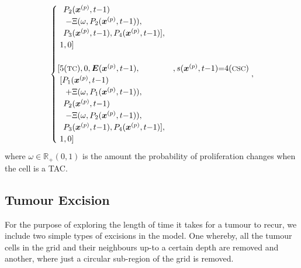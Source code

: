 \documentclass[\main/thesis.tex]{subfiles}
\begin{document}
\begin{align}
\begin{cases}
                     \hspace{0.25cm} P_2(\boldsymbol{x}^{(p)}, t{-}1) \\
                     \hspace{0.35cm} {-} \Xi(\omega, P_2(\boldsymbol{x}^{(p)}, t{-}1)),\\
                     \hspace{0.25cm} P_3(\boldsymbol{x}^{(p)}, t{-}1),
                                     P_4(\boldsymbol{x}^{(p)}, t{-}1) ],\\
                     \hspace{0.1cm}  1, 0 ] \\
                     \\
                     [ 5 (\text{{\footnotesize TC}}), 0, 
                       \boldsymbol{E}(\boldsymbol{x}^{(p)}, t{-}1),
                       &, s(\boldsymbol{x}^{(p)}, t{-}1) {=} 4 (\text{{\footnotesize CSC}})\\
                     \hspace{0.1cm} [ P_1(\boldsymbol{x}^{(p)}, t{-}1) \\
                     \hspace{0.35cm} {+} \Xi(\omega, P_1(\boldsymbol{x}^{(p)}, t{-}1)),\\
                     \hspace{0.25cm} P_2(\boldsymbol{x}^{(p)}, t{-}1) \\
                     \hspace{0.35cm} {-} \Xi(\omega, P_2(\boldsymbol{x}^{(p)}, t{-}1)),\\
                     \hspace{0.25cm} P_3(\boldsymbol{x}^{(p)}, t{-}1),
                                     P_4(\boldsymbol{x}^{(p)}, t{-}1) ],\\
                     \hspace{0.1cm}  1, 0 ]
                    \end{cases}\label{eq:DifferentiationStateChangeChild},
\end{align}
where $\omega {\in} \mathbb{R}_+(0, 1)$ is the amount the probability of proliferation changes when 
the cell is a TAC.

\subsection{Tumour Excision}
For the purpose of exploring the length of time it takes for a tumour to recur, we include two simple types of excisions in the model. One whereby, all the tumour cells in the grid and their neighbours up-to a certain depth are removed and another, where just a circular sub-region of the grid is removed. 
\end{document}
